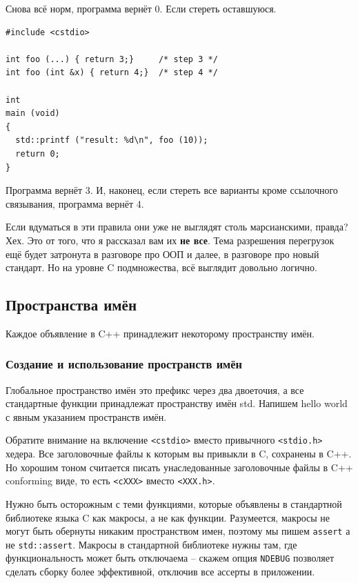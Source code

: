 \documentclass[a4paper,12pt,oneside]{article}
\begin{document}
Снова всё норм, программа вернёт 0. Если стереть оставшуюся.

\begin{lstlisting}
#include <cstdio>

int foo (...) { return 3;}     /* step 3 */
int foo (int &x) { return 4;}  /* step 4 */

int
main (void)
{
  std::printf ("result: %d\n", foo (10));
  return 0;
}
\end{lstlisting}

Программа вернёт 3. И, наконец, если стереть все варианты кроме ссылочного связывания, программа вернёт 4.

Если вдуматься в эти правила они уже не выглядят столь марсианскими, правда? Хех. Это от того, что я рассказал вам их \textbf{не все}. Тема разрешения перегрузок ещё будет затронута в разговоре про ООП и далее, в разговоре про новый стандарт. Но на уровне C подмножества, всё выглядит довольно логично.

\pagebreak
\subsection{Пространства имён}\label{Namespaces}

Каждое объявление в C++ принадлежит некоторому пространству имён. 

\subsubsection{Создание и использование пространств имён}

Глобальное пространство имён это префикс через два двоеточия, а все стандартные функции принадлежат пространству имён std. Напишем hello world с явным указанием пространств имён.



Обратите внимание на включение \lstinline!<cstdio>! вместо привычного \lstinline!<stdio.h>! хедера. Все заголовочные файлы к которым вы привыкли в C, сохранены в C++. Но хорошим тоном считается писать унаследованные заголовочные файлы в C++ conforming виде, то есть \lstinline!<cXXX>! вместо \lstinline!<XXX.h>!.

Нужно быть осторожным с теми функциями, которые объявлены в стандартной библиотеке языка C как макросы, а не как функции. Разумеется, макросы не могут быть обернуты никаким пространством имен, поэтому мы пишем \lstinline!assert! а не \lstinline!std::assert!. Макросы в стандартной библиотеке нужны там, где функциональность может быть отключаема -- скажем опция \lstinline!NDEBUG! позволяет сделать сборку более эффективной, отключив все ассерты в приложении. 
\end{document}
